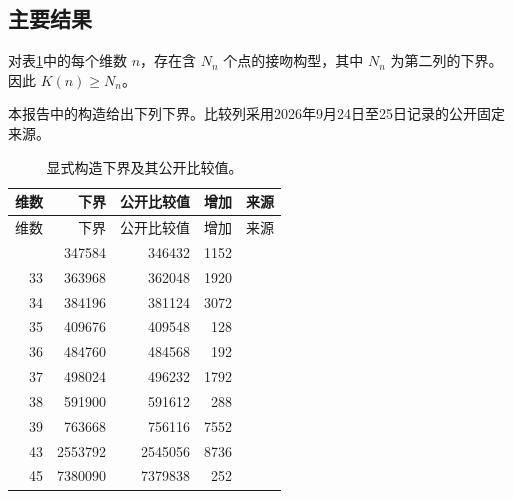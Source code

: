 \subsection{主要结果}

\begin{theorem}\label{thm:main}
对表\ref{tab:results}中的每个维数 $n$，存在含 $N_n$ 个点的接吻构型，其中 $N_n$ 为第二列的下界。因此 $K(n)\ge N_n$。
\end{theorem}

本报告中的构造给出下列下界。比较列采用2026年9月24日至25日记录的公开固定来源。

\begin{longtable}{rrrrl}
\caption{显式构造下界及其公开比较值。}\label{tab:results}\\
\toprule
维数 & 下界 & 公开比较值 & 增加 & 来源\\\midrule
\endfirsthead
\toprule
维数 & 下界 & 公开比较值 & 增加 & 来源\\\midrule
\endhead
\bottomrule\endfoot
32 & 347584 & 346432 & 1152 & \cite{brouwer} \\
33 & 363968 & 362048 & 1920 & \cite{brouwer} \\
34 & 384196 & 381124 & 3072 & \cite{brouwer} \\
35 & 409676 & 409548 & 128 & \cite{brouwer} \\
36 & 484760 & 484568 & 192 & \cite{brouwer} \\
37 & 498024 & 496232 & 1792 & \cite{brouwer} \\
38 & 591900 & 591612 & 288 & \cite{kissingnumbers} \\
39 & 763668 & 756116 & 7552 & \cite{kissingnumbers} \\
43 & 2553792 & 2545056 & 8736 & \cite{sunwang-sections,crosssections} \\
45 & 7380090 & 7379838 & 252 & \cite{sunwang-sections,crosssections} \\
\end{longtable}
